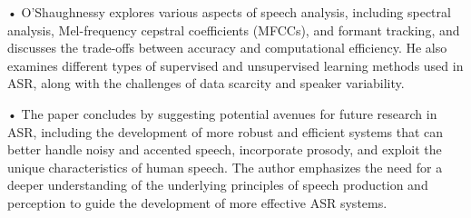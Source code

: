 •	O'Shaughnessy explores various aspects of speech analysis, including spectral analysis, Mel-frequency cepstral coefficients (MFCCs), and formant tracking, and discusses the trade-offs between accuracy and computational efficiency. He also examines different types of supervised and unsupervised learning methods used in ASR, along with the challenges of data scarcity and speaker variability.

•	The paper concludes by suggesting potential avenues for future research in ASR, including the development of more robust and efficient systems that can better handle noisy and accented speech, incorporate prosody, and exploit the unique characteristics of human speech. The author emphasizes the need for a deeper understanding of the underlying principles of speech production and perception to guide the development of more effective ASR systems.

